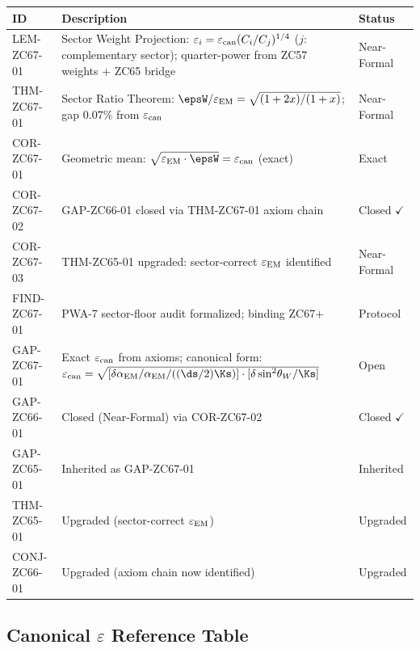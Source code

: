 \documentclass[12pt, a4paper]{article}
\renewcommand{\epsEM}{\varepsilon_{\rm EM}}
\renewcommand{\epscan}{\varepsilon_{\rm can}}
\renewcommand{\swsq}{\sin^2\!\theta_W}
\renewcommand{\aEM}{\alpha_{\rm EM}}
\begin{document}
\bigskip
\begin{formalbox}[title={Atomic Registry --- ZC67}]
\begin{center}
\renewcommand{\arraystretch}{1.3}
\small
\begin{tabular}{lp{7.5cm}l}
\toprule
ID & Description & Status \\
\midrule
LEM-ZC67-01
  & Sector Weight Projection:
    $\varepsilon_i = \epscan(C_i/C_j)^{1/4}$ ($j$: complementary sector);
    quarter-power from ZC57 weights + ZC65 bridge
  & Near-Formal \\
THM-ZC67-01
  & Sector Ratio Theorem:
    $\epsW/\epsEM = \sqrt{(1+2x)/(1+x)}$;
    gap $0.07\%$ from $\epscan$
  & Near-Formal \\
COR-ZC67-01
  & Geometric mean: $\sqrt{\epsEM\cdot\epsW} = \epscan$ (exact)
  & Exact \\
COR-ZC67-02
  & GAP-ZC66-01 closed via THM-ZC67-01 axiom chain
  & Closed $\checkmark$ \\
COR-ZC67-03
  & THM-ZC65-01 upgraded: sector-correct $\epsEM$ identified
  & Near-Formal \\
FIND-ZC67-01
  & PWA-7 sector-floor audit formalized; binding ZC67+
  & Protocol \\
GAP-ZC67-01
  & Exact $\epscan$ from axioms;
    canonical form: $\epscan = \sqrt{[\delta\aEM/\aEM / ((\ds/2)\Ks)]
    \cdot[\delta\swsq/\Ks]}$
  & Open \\
\midrule
GAP-ZC66-01  & Closed (Near-Formal) via COR-ZC67-02 & Closed $\checkmark$ \\
GAP-ZC65-01  & Inherited as GAP-ZC67-01              & Inherited \\
THM-ZC65-01  & Upgraded (sector-correct $\epsEM$)    & Upgraded \\
CONJ-ZC66-01 & Upgraded (axiom chain now identified) & Upgraded \\
\bottomrule
\end{tabular}
\end{center}
\end{formalbox}


\subsection{Canonical $\varepsilon$ Reference Table}
\label{sec:eps-table}
\end{document}
